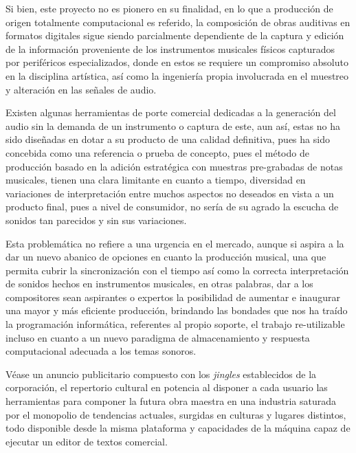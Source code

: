 \documentclass{book}
\begin{document}
	Si bien, este proyecto no es pionero en su finalidad, en lo que a producción de origen totalmente computacional es referido, la composición de obras auditivas en formatos digitales sigue siendo parcialmente dependiente de la captura y edición de la información proveniente de los instrumentos musicales físicos capturados por periféricos especializados, donde en estos se requiere un compromiso absoluto en la disciplina artística, así como la ingeniería propia involucrada en el muestreo y alteración en las señales de audio.\par
	
	Existen algunas herramientas de porte comercial dedicadas a la generación del audio sin la demanda de un instrumento o captura de este, aun así, estas no ha sido diseñadas en dotar a su producto de una calidad definitiva, pues ha sido concebida como una referencia o prueba de concepto, pues el método de producción basado en la adición estratégica con muestras pre-grabadas de notas musicales, tienen una clara limitante en cuanto a tiempo, diversidad en variaciones de interpretación entre muchos aspectos no deseados en vista a un producto final, pues a nivel de consumidor, no sería de su agrado la escucha de sonidos tan parecidos y sin sus variaciones.\par
	
	Esta problemática no refiere a una urgencia en el mercado, aunque si aspira a la dar un nuevo abanico de opciones en cuanto la producción musical, una que permita cubrir la sincronización con el tiempo así como la correcta interpretación de sonidos hechos en instrumentos musicales, en otras palabras, dar a los compositores sean aspirantes o expertos la posibilidad de aumentar e inaugurar una mayor y más eficiente producción, brindando las bondades que nos ha traído la programación informática, referentes al propio soporte, el trabajo re-utilizable incluso en cuanto a un nuevo paradigma de almacenamiento y respuesta computacional adecuada a los temas sonoros.\par
	
	Véase un anuncio publicitario compuesto con los \emph{jingles} establecidos de la corporación, el repertorio cultural en potencia al disponer a cada usuario las herramientas para componer la futura obra maestra en una industria saturada por el monopolio de tendencias actuales, surgidas en culturas y lugares distintos, todo disponible desde la misma plataforma y capacidades de la máquina capaz de ejecutar un editor de textos comercial.\par
	
\end{document}
